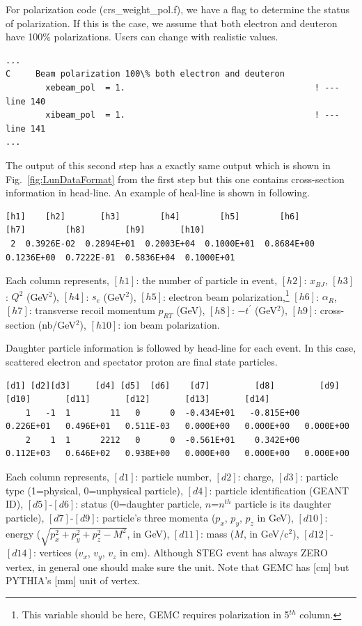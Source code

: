 \documentclass[12pt,letterpaper]{article}
\begin{document}
For polarization code (crs\_weight\_pol.f), we have a flag to determine the status of polarization. If this is the case, we assume that both electron and deuteron have 100\% polarizations. Users can change with realistic values.
\fontsize{9}{9}
\begin{Verbatim}[frame=single]
...
C     Beam polarization 100\% both electron and deuteron
        xebeam_pol  = 1.                                      ! --- line 140
        xibeam_pol  = 1.                                      ! --- line 141
...
\end{Verbatim}
\fontsize{12}{12}

The output of this second step has a exactly same output which is shown in Fig.~\ref{fig:LunDataFormat} from the first step but this one contains cross-section information in head-line. An example of heal-line is shown in following.
\fontsize{7}{7}
\begin{Verbatim}[frame=single]
[h1]    [h2]       [h3]        [h4]        [h5]        [h6]        [h7]        [h8]        [h9]       [h10]
 2  0.3926E-02  0.2894E+01  0.2003E+04  0.1000E+01  0.8684E+00  0.1236E+00  0.7222E-01  0.5836E+04  0.1000E+01
\end{Verbatim}
\fontsize{12}{12}
Each column represents, $[h1]$: the number of particle in event, $[h2]$: $x_{BJ}$, $[h3]$: $Q^2$ (GeV$^2$), $[h4]$: $s_e$ (GeV$^2$), $[h5]$: electron beam polarization,\footnote{This variable should be here, GEMC requires polarization in 5$^{th}$ column.} $[h6]$: $\alpha_R$, $[h7]$: transverse recoil momentum $p_{RT}$ (GeV), $[h8]$: $-t^{\prime}$ (GeV$^2$), $[h9]$: cross-section (nb/GeV$^2$), $[h10]$: ion beam polarization.

Daughter particle information is followed by head-line for each event. In this case, scattered electron and spectator proton are final state particles.
\fontsize{6}{6}
\begin{Verbatim}[frame=single]
  [d1] [d2][d3]     [d4] [d5]  [d6]    [d7]         [d8]         [d9]        [d10]       [d11]       [d12]       [d13]       [d14]
    1   -1  1        11   0      0  -0.434E+01   -0.815E+00    0.226E+01   0.496E+01   0.511E-03   0.000E+00   0.000E+00   0.000E+00
    2    1  1      2212   0      0  -0.561E+01    0.342E+00    0.112E+03   0.646E+02   0.938E+00   0.000E+00   0.000E+00   0.000E+00
\end{Verbatim}
\fontsize{12}{12}
Each column represents, $[d1]$: particle number, $[d2]$: charge, $[d3]$: particle type (1=physical, 0=unphysical particle), $[d4]$: particle identification (GEANT ID), $[d5]$-$[d6]$: status (0=daughter particle, $n$=$n^{th}$ particle is its daughter particle), $[d7]$-$[d9]$: particle's three momenta ($p_x$, $p_y$, $p_z$ in GeV), $[d10]$: energy ($\sqrt{p_x^2+p_y^2+p_z^2-M^2}$, in GeV), $[d11]$: mass ($M$, in GeV/c$^2$), $[d12]$-$[d14]$: vertices ($v_x$, $v_y$, $v_z$ in cm). Although STEG event has always ZERO vertex, in general one should make sure the unit. Note that GEMC has [cm] but PYTHIA's [mm] unit of vertex. \\
\end{document}
